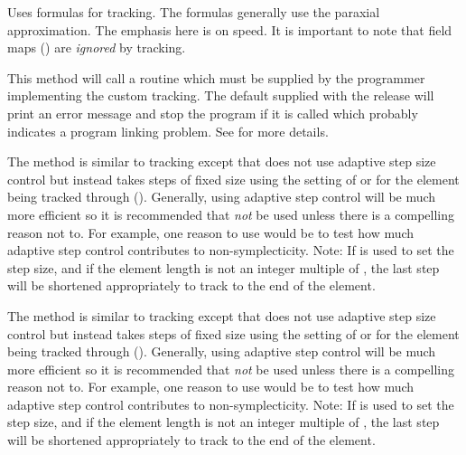 \begin{description}

\item[\vn{Bmad_Standard}]
Uses formulas for tracking. The formulas generally use the paraxial approximation. The emphasis here
is on speed. It is important to note that field maps () are {\em ignored} by
 tracking.

\item[\vn{Custom}]
This method will call a routine  which must be
supplied by the programmer implementing the custom tracking. The
default  supplied with the \bmad release will print
an error message and stop the program if it is called which probably
indicates a program linking problem. See  for more details.

\item[\vn{fixed_step_runge_kutta}]
The  method is similar to  tracking except that
 does not use adaptive step size control but instead takes steps of fixed
size using the setting of  or  for the element being tracked through ().
Generally, using adaptive step control will be much more efficient so it is recommended that
 {\em not} be used unless there is a compelling reason not to. For
example, one reason to use  would be to test how much adaptive step
control contributes to non-symplecticity. Note: If  is used to set the step size, and if the
element length is not an integer multiple of , the last step will be shortened appropriately
to track to the end of the element.

\item[\vn{fixed_step_time_runge_kutta}]
The  method is similar to  tracking except that
 does not use adaptive step size control but instead takes steps of fixed
size using the setting of  or  for the element being tracked through ().
Generally, using adaptive step control will be much more efficient so it is recommended that
 {\em not} be used unless there is a compelling reason not to. For
example, one reason to use  would be to test how much adaptive step
control contributes to non-symplecticity. Note: If  is used to set the step size, and if the
element length is not an integer multiple of , the last step will be shortened appropriately
to track to the end of the element.


\end{description}
